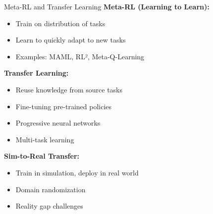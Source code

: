 \documentclass[aspectratio=169]{beamer}
\begin{document}
\begin{frame}{Meta-RL and Transfer Learning}
  \textbf{Meta-RL (Learning to Learn):}
  \begin{itemize}
    \item Train on distribution of tasks
    \item Learn to quickly adapt to new tasks
    \item Examples: MAML, RL², Meta-Q-Learning
  \end{itemize}

  \vspace{0.5em}

  \textbf{Transfer Learning:}
  \begin{itemize}
    \item Reuse knowledge from source tasks
    \item Fine-tuning pre-trained policies
    \item Progressive neural networks
    \item Multi-task learning
  \end{itemize}

  \vspace{0.5em}

  \textbf{Sim-to-Real Transfer:}
  \begin{itemize}
    \item Train in simulation, deploy in real world
    \item Domain randomization
    \item Reality gap challenges
  \end{itemize}
\end{frame}
\end{document}
